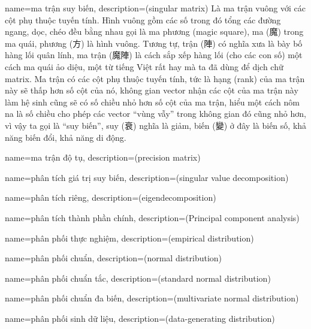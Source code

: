 {
    name={ma trận suy biến},
    description={(singular matrix) Là ma trận vuông với các cột
    phụ thuộc tuyến tính. Hình vuông gồm các số trong đó tổng các
    đường ngang, dọc, chéo đều bằng nhau gọi là ma phương
    (magic square), ma (魔) trong ma quái, phương (方) là hình vuông.
    Tương tự, trận (陣) có nghĩa xưa là bày bố hàng lối quân lính,
    ma trận (魔陣) là cách sắp xếp hàng lối (cho các con số) một
    cách ma quái ảo diệu, một từ tiếng Việt rất hay mà ta đã dùng
    để dịch chữ matrix. Ma trận có các cột phụ thuộc tuyến tính,
    tức là hạng (rank) của ma trận này sẽ thấp hơn số cột của nó,
    không gian vector nhận các cột của ma trận này làm hệ sinh
    cũng sẽ có số chiều nhỏ hơn số cột của ma trận, hiểu một cách
    nôm na là số chiều cho phép các vector ``vùng vẫy'' trong không gian
    đó cũng nhỏ hơn, vì vậy ta gọi là ``suy biến'', suy (衰) nghĩa là giảm,
    biến (變) ở đây là biến số, khả năng biến đổi, khả năng di động.}
}

{
    name={ma trận độ tụ},
    description={(precision matrix)}
}

{
    name={phân tích giá trị suy biến},
    description={(singular value decomposition)}
}


{
    name={phân tích riêng},
    description={(eigendecomposition)}
}

{
    name={phân tích thành phần chính},
    description={(Principal component analysis)}
}


{
    name={phân phối thực nghiệm},
    description={(empirical distribution)}
}

{
    name={phân phối chuẩn},
    description={(normal distribution)}
}

{
    name={phân phối chuẩn tắc},
    description={(standard normal distribution)}
}

{
    name={phân phối chuẩn đa biến},
    description={(multivariate normal distribution)}
}

{
    name={phân phối sinh dữ liệu},
    description={(data-generating distribution)}
}

